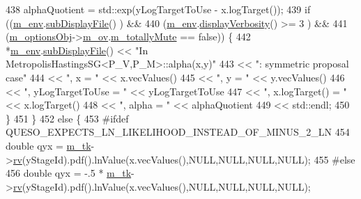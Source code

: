 \begin{DoxyCode}
438         alphaQuotient = std::exp(yLogTargetToUse - x.logTarget());
439         \textcolor{keywordflow}{if} ((\hyperlink{class_q_u_e_s_o_1_1_metropolis_hastings_s_g_ac8ea061e55b920e0c8f9bce5c3f20e52}{m\_env}.\hyperlink{class_q_u_e_s_o_1_1_base_environment_a8a0064746ae8dddfece4229b9ad374d6}{subDisplayFile}()                   ) &&
440             (\hyperlink{class_q_u_e_s_o_1_1_metropolis_hastings_s_g_ac8ea061e55b920e0c8f9bce5c3f20e52}{m\_env}.\hyperlink{class_q_u_e_s_o_1_1_base_environment_a1fe5f244fc0316a0ab3e37463f108b96}{displayVerbosity}() >= 3            ) &&
441             (\hyperlink{class_q_u_e_s_o_1_1_metropolis_hastings_s_g_a5d0bc9f73d50d272aa6bfb5ef5939ef3}{m\_optionsObj}->\hyperlink{class_q_u_e_s_o_1_1_metropolis_hastings_s_g_options_a9d4792d9fc2dc5439b8ab489b0c236eb}{m\_ov}.\hyperlink{class_q_u_e_s_o_1_1_mh_options_values_af812309e81191e88dfdc87c5815141a3}{m\_totallyMute} == \textcolor{keyword}{false})) \{
442           *\hyperlink{class_q_u_e_s_o_1_1_metropolis_hastings_s_g_ac8ea061e55b920e0c8f9bce5c3f20e52}{m\_env}.\hyperlink{class_q_u_e_s_o_1_1_base_environment_a8a0064746ae8dddfece4229b9ad374d6}{subDisplayFile}() << \textcolor{stringliteral}{"In MetropolisHastingsSG<P\_V,P\_M>::alpha(x,y)"}
443                                  << \textcolor{stringliteral}{": symmetric proposal case"}
444                                  << \textcolor{stringliteral}{", x = "}               << x.vecValues()
445                                  << \textcolor{stringliteral}{", y = "}               << y.vecValues()
446                                  << \textcolor{stringliteral}{", yLogTargetToUse = "} << yLogTargetToUse
447                                  << \textcolor{stringliteral}{", x.logTarget() = "}   << x.logTarget()
448                                  << \textcolor{stringliteral}{", alpha = "}           << alphaQuotient
449                                  << std::endl;
450         \}
451       \}
452       \textcolor{keywordflow}{else} \{
453 \textcolor{preprocessor}{#ifdef QUESO\_EXPECTS\_LN\_LIKELIHOOD\_INSTEAD\_OF\_MINUS\_2\_LN}
454 \textcolor{preprocessor}{}        \textcolor{keywordtype}{double} qyx = \hyperlink{class_q_u_e_s_o_1_1_metropolis_hastings_s_g_a26e9680abddfb793486c995fa16f8c2d}{m\_tk}->\hyperlink{class_q_u_e_s_o_1_1_base_t_k_group_a6bd8e0bec0105471aad8801cbf1a0851}{rv}(yStageId).pdf().lnValue(x.vecValues(),NULL,NULL,NULL,NULL);
455 \textcolor{preprocessor}{#else}
456 \textcolor{preprocessor}{}        \textcolor{keywordtype}{double} qyx = -.5 * \hyperlink{class_q_u_e_s_o_1_1_metropolis_hastings_s_g_a26e9680abddfb793486c995fa16f8c2d}{m\_tk}->\hyperlink{class_q_u_e_s_o_1_1_base_t_k_group_a6bd8e0bec0105471aad8801cbf1a0851}{rv}(yStageId).pdf().lnValue(x.vecValues(),NULL,NULL,NULL,NULL);

\end{DoxyCode}

